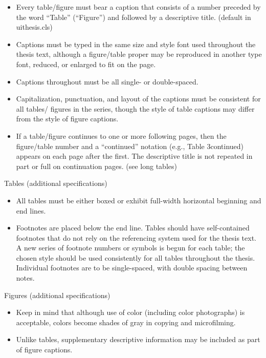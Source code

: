 \begin{itemize}
\item Every table/figure must bear a caption that consists of a number preceded
by the word \textquotedblleft{}Table\textquotedblright{} (\textquotedblleft{}Figure\textquotedblright{})
and followed by a descriptive title. (default in uithesis.cls)
\item Captions must be typed in the same size and style font used throughout
the thesis text, although a figure/table proper may be reproduced
in another type font, reduced, or enlarged to fit on the page.
\item Captions throughout must be all single- or double-spaced.
\item Capitalization, punctuation, and layout of the captions must be consistent
for all tables/ figures in the series, though the style of table captions
may differ from the style of figure captions.
\item If a table/figure continues to one or more following pages, then the
figure/table number and a \textquotedblleft{}continued\textquotedblright{}
notation (e.g., Table 3\textemdash{}continued) appears on each page
after the first. The descriptive title is not repeated in part or
full on continuation pages. (see long tables)
\end{itemize}
Tables (additional specifications)
\begin{itemize}
\item All tables must be either boxed or exhibit full-width horizontal beginning
and end lines.
\item Footnotes are placed below the end line. Tables should have self-contained
footnotes that do not rely on the referencing system used for the
thesis text. A new series of footnote numbers or symbols is begun
for each table; the chosen style should be used consistently for all
tables throughout the thesis. Individual footnotes are to be single-spaced,
with double spacing between notes.
\end{itemize}
Figures (additional specifications)
\begin{itemize}
\item Keep in mind that although use of color (including color photographs)
is acceptable, colors become shades of gray in copying and microfilming.
\item Unlike tables, supplementary descriptive information may be included
as part of figure captions.
\end{itemize}